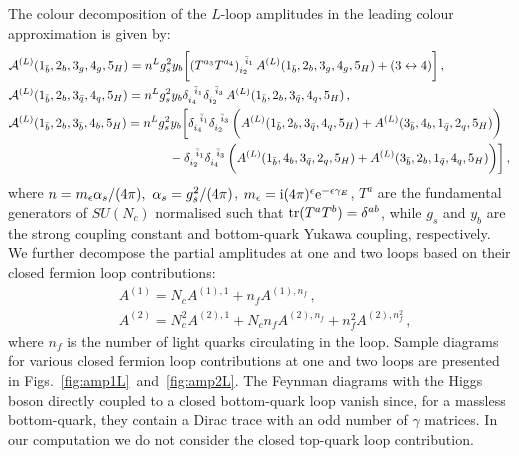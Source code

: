 \documentclass[main.tex]{subfiles}
\begin{document}
The colour decomposition of the $L$-loop amplitudes in the leading colour approximation is given by:
\begin{align}
&\mathcal{A}^{(L)}(1_{\bar b},2_{b},3_{g},4_{g} ,5_{H}) = n^L g_s^2 y_b \bigg[ 
  (T^{a_3} T^{a_4})_{i_2}^{\;\;\bar i_1} \,  A^{(L)}(1_{\bar b},2_{b},3_{g},4_{g} ,5_{H}) + ( 3 \leftrightarrow 4 ) \bigg]\,, \nonumber\\
&\mathcal{A}^{(L)}(1_{\bar b},2_{b},3_{\bar{q}},4_{q} ,5_{H}) = n^L  g_s^2 y_b 
 \delta_{i_4}^{\;\;\bar i_1} \delta_{i_2}^{\;\;\bar i_3}  \,
  A^{(L)}(1_{\bar b},2_{b},3_{\bar{q}},4_{q} ,5_{H}) \,,  \label{eq:colourdecomposition} \\
&\mathcal{A}^{(L)}(1_{\bar b},2_{b},3_{\bar{b}},4_{b} ,5_{H}) = n^L  g_s^2 y_b \bigg[
  \delta_{i_4}^{\;\;\bar i_1} \delta_{i_2}^{\;\;\bar i_3}  \, \biggl( A^{(L)}(1_{\bar b},2_{b},3_{\bar{q}},4_{q} ,5_{H}) + A^{(L)}(3_{\bar b},4_{b},1_{\bar{q}},2_{q} ,5_{H}) \biggr) \,  \nonumber\\
& \hspace{4.5cm} -\delta_{i_2}^{\;\;\bar i_1} \delta_{i_4}^{\;\;\bar i_3}  \, \biggl( A^{(L)}(1_{\bar b},4_{b},3_{\bar{q}},2_{q} ,5_{H}) + A^{(L)}(3_{\bar b},2_{b},1_{\bar{q}},4_{q} ,5_{H}) \biggr) \bigg]\,, 
\nonumber 
\end{align}
where $n= m_\epsilon  \alpha_s/(4\pi),\ \alpha_s = g_s^2/(4\pi)$, $m_\epsilon=\mathrm{i} (4\pi)^{\epsilon} \mathrm{e}^{-\epsilon\gamma_E}$, $T^a$ 
are the fundamental generators of $SU(N_c)$ normalised such that $\operatorname{\rm tr}(T^a T^b) = \delta^{ab}$,
while $g_s$ and $y_b$ are the strong coupling constant and bottom-quark Yukawa coupling, respectively. 
We further decompose the partial amplitudes at one and two loops based on their closed fermion loop contributions:
\begin{align}
& A^{(1)} = N_c A^{(1),1} + n_f A^{(1),n_f}  \,,  
\label{eq:NfDecomposition1L} \\
& A^{(2)} = N_c^2 A^{(2),1} + N_c n_f A^{(2),n_f} + n_f^2 A^{(2),n_f^2}  \,, 
\label{eq:NfDecomposition2L}
\end{align}
where $n_f$ is the number of light quarks circulating in the loop.
Sample diagrams for various closed fermion loop contributions at one and two loops are presented in Figs.~\ref{fig:amp1L}~and~\ref{fig:amp2L}.
The Feynman diagrams with the Higgs boson directly coupled to a closed bottom-quark loop vanish since, for a massless bottom-quark, they contain a Dirac trace with an odd number of $\gamma$ matrices. 
In our computation we do not consider the closed top-quark loop contribution. 
\end{document}
